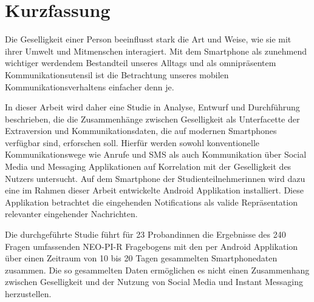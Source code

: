 
\chapter*{Kurzfassung}
\label{ch:GermanAbstract}

Die Geselligkeit einer Person beeinflusst stark die Art und Weise, wie sie mit ihrer Umwelt und Mitmenschen interagiert. 
Mit dem Smartphone als zunehmend wichtiger werdendem Bestandteil unseres Alltags und als omnipräsentem Kommunikationsutensil ist 
die Betrachtung unseres mobilen Kommunikationsverhaltens einfacher denn je. 
\par
In dieser Arbeit wird daher eine Studie in Analyse, Entwurf und Durchführung beschrieben, die die Zusammenhänge zwischen Geselligkeit als Unterfacette der Extraversion und Kommunikationsdaten, die auf modernen Smartphones verfügbar sind, erforschen soll. 
Hierfür werden sowohl konventionelle Kommunikationswege wie Anrufe und SMS als auch Kommunikation über Social Media und Messaging Applikationen auf Korrelation mit der Geselligkeit des Nutzers untersucht.
Auf dem Smartphone der Studienteilnehmerinnen wird dazu eine im Rahmen dieser Arbeit entwickelte Android Applikation installiert.
Diese Applikation betrachtet die eingehenden Notifications als valide Repräsentation relevanter eingehender Nachrichten.
\par
Die durchgeführte Studie führt für 23 Probandinnen die Ergebnisse des 240 Fragen umfassenden NEO-PI-R Fragebogens mit den per Android Applikation über einen Zeitraum von 10 bis 20 Tagen gesammelten Smartphonedaten zusammen.
Die so gesammelten Daten ermöglichen es nicht einen Zusammenhang zwischen Geselligkeit und der Nutzung von Social Media und Instant Messaging herzustellen.
\par 


